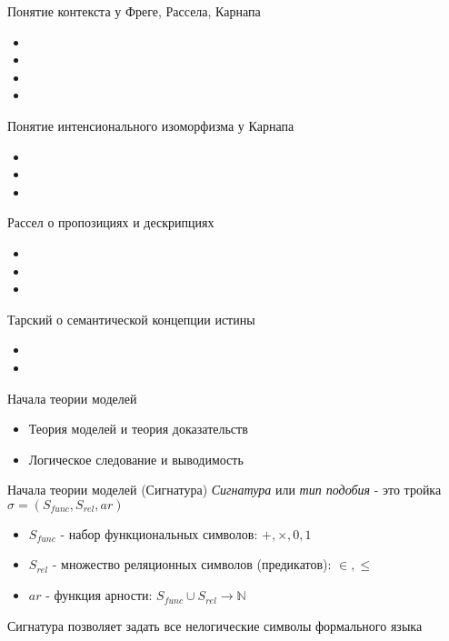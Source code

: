 \documentclass{beamer}
\begin{document}
\begin{frame}{Понятие контекста у Фреге, Рассела, Карнапа}
  \begin{itemize}
    \item 
    \item 
    \item 
    \item 
  \end{itemize}
\end{frame}

\begin{frame}{Понятие интенсионального изоморфизма у Карнапа}
  \begin{itemize}
    \item 
    \item 
    \item 
  \end{itemize}
\end{frame}

\begin{frame}{Рассел о пропозициях и дескрипциях}
  \begin{itemize}
    \item 
    \item 
    \item 
  \end{itemize}
\end{frame}

\begin{frame}{Тарский о семантической концепции истины}
  \begin{itemize}
    \item 
    \item 
  \end{itemize}
\end{frame}

\begin{frame}{Начала теории моделей}
  \begin{itemize}
    \item Теория моделей и теория доказательств
    \item Логическое следование и выводимость
  \end{itemize}
\end{frame}

\begin{frame}{Начала теории моделей (Сигнатура)}
  \textit{Сигнатура} или \textit{тип подобия} - это тройка $\sigma = (S_{func}, S_{rel}, ar)$\\
  \bigskip
  \begin{itemize}
    \item $S_{func}$ - набор функциональных символов: $+, \times, 0, 1$
    \item $S_{rel}$ - множество реляционных символов  (предикатов): $\in, \leq$
    \item $ar$ - функция арности: $S_{func} \cup S_{rel} \to \mathbb{N}$
  \end{itemize}
  \bigskip
  Сигнатура позволяет задать все нелогические символы формального языка
\end{frame}
\end{document}
